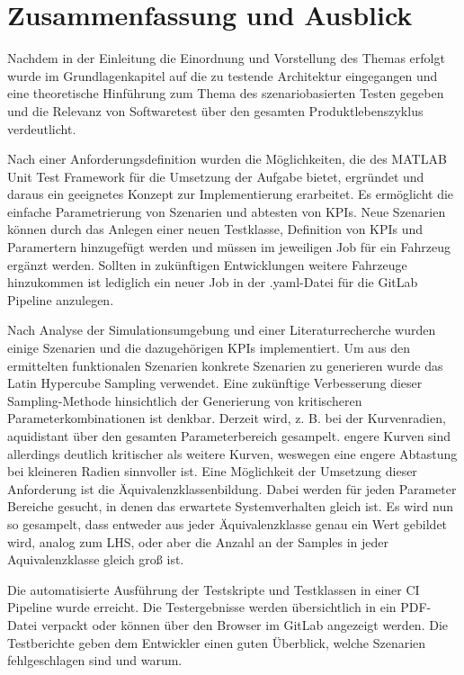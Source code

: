 \chapter{Zusammenfassung und Ausblick} \label{chap:Zusammenfassung}
\thispagestyle{empty}

Nachdem in der Einleitung die Einordnung und Vorstellung des Themas erfolgt wurde im Grundlagenkapitel auf die zu testende Architektur eingegangen und eine theoretische Hinführung zum Thema des szenariobasierten Testen gegeben und die Relevanz von Softwaretest über den gesamten Produktlebenszyklus verdeutlicht.

Nach einer Anforderungsdefinition wurden die Möglichkeiten, die des MATLAB\textsuperscript{\textregistered} Unit Test Framework für die Umsetzung der Aufgabe bietet, ergründet und daraus ein geeignetes Konzept zur Implementierung erarbeitet. Es ermöglicht die einfache Parametrierung von Szenarien und abtesten von KPIs. Neue Szenarien können durch das Anlegen einer neuen Testklasse, Definition von KPIs und Paramertern hinzugefügt werden und müssen im jeweiligen Job für ein Fahrzeug ergänzt werden. Sollten in zukünftigen Entwicklungen weitere Fahrzeuge hinzukommen ist lediglich ein neuer Job in der .yaml-Datei für die GitLab Pipeline anzulegen. 

Nach Analyse der Simulationsumgebung und einer Literaturrecherche wurden einige Szenarien und die dazugehörigen KPIs implementiert. Um aus den ermittelten funktionalen Szenarien konkrete Szenarien zu generieren wurde das Latin Hypercube Sampling verwendet. Eine zukünftige Verbesserung dieser Sampling-Methode hinsichtlich der Generierung von kritischeren Parameterkombinationen ist denkbar. Derzeit wird, z. B. bei der Kurvenradien, aquidistant über den gesamten Parameterbereich gesampelt. engere Kurven sind allerdings deutlich kritischer als weitere Kurven, weswegen eine engere Abtastung bei kleineren Radien sinnvoller ist. Eine Möglichkeit der Umsetzung dieser Anforderung ist die Äquivalenzklassenbildung. Dabei werden für jeden Parameter Bereiche gesucht, in denen das erwartete Systemverhalten gleich ist. Es wird nun so gesampelt, dass entweder aus jeder Äquivalenzklasse genau ein Wert gebildet wird, analog zum LHS, oder aber die Anzahl an der Samples in jeder Aquivalenzklasse gleich groß ist.

Die automatisierte Ausführung der Testskripte und Testklassen in einer CI Pipeline wurde erreicht. Die Testergebnisse werden übersichtlich in ein PDF-Datei verpackt oder können über den Browser im GitLab angezeigt werden. Die Testberichte geben dem Entwickler einen guten Überblick, welche Szenarien fehlgeschlagen sind und warum.